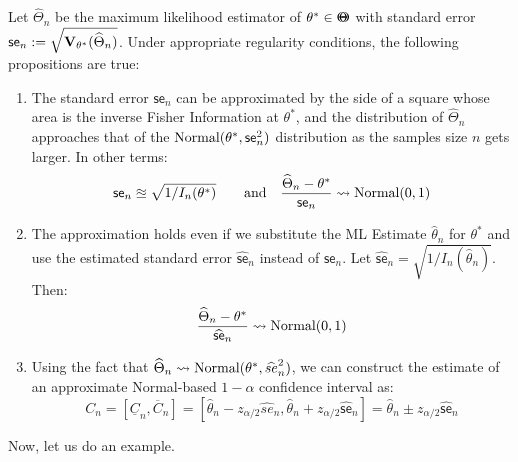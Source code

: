\begin{prop}
Let $\widehat{\Theta}_n$ be the maximum likelihood estimator of $\theta^* \in {\Theta}\mspace{-11 mu}{\Theta}$ with standard error $\mathsf{se}_n := \sqrt{\mathbf{V}_{\theta^*} (\widehat{\Theta}_n)}$.  Under appropriate regularity conditions, the following propositions are true:
\begin{enumerate}
\item The standard error $\mathsf{se}_n$ can be approximated by the side of a square whose area is the inverse Fisher Information at $\theta^*$, and the distribution of $\widehat{\Theta}_n$ approaches that of the $\mbox{{\rm Normal}}(\theta^*, \mathsf{se}_n^2)$ distribution as the samples size $n$ gets larger.  In other terms:
\[
\mathsf{se}_n \approxeq \sqrt{1/I_n(\theta^*)} \qquad \text{and} \quad \frac{\widehat{\Theta}_n-\theta^*}{\mathsf{se}_n} \rightsquigarrow \mbox{{\rm Normal}}(0,1)
\]
\item The approximation holds even if we substitute the ML Estimate $\widehat{\theta}_n$ for $\theta^*$ and use the estimated standard error $\widehat{\mathsf{se}}_n$ instead of $\mathsf{se}_n$.  Let $\widehat{\mathsf{se}}_n = \sqrt{1/I_n(\widehat{\theta}_n)}$.  Then:
\[
 \frac{\widehat{\Theta}_n-\theta^*}{\widehat{\mathsf{se}}_n} \rightsquigarrow \mbox{{\rm Normal}}(0,1)
\]
\item Using the fact that $\widehat{\Theta}_n \rightsquigarrow \mbox{{\rm Normal}}(\theta^*,\widehat{se}_n^2)$, we can construct the estimate of an approximate Normal-based $1-\alpha$ confidence interval as:
\[
C_n  =[\underline{C}_n, \overline{C}_n]= [\widehat{\theta}_n - z_{\alpha/2} \widehat{se}_n, \widehat{\theta}_n + z_{\alpha/2} \widehat{\mathsf{se}}_n]= \widehat{\theta}_n \pm z_{\alpha/2} \widehat{\mathsf{se}}_n
\]
\end{enumerate}
\end{prop}
Now, let us do an example.
